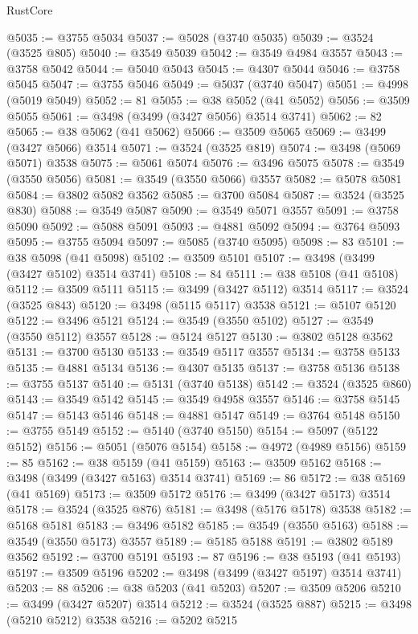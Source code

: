 \begin{lexlean}{RustCore}
\begin{coremodule}
@5035 := @3755 @5034
@5037 := @5028 (@3740 @5035)
@5039 := @3524 (@3525 @805)
@5040 := @3549 @5039
@5042 := @3549 @4984 @3557
@5043 := @3758 @5042
@5044 := @5040 @5043
@5045 := @4307 @5044
@5046 := @3758 @5045
@5047 := @3755 @5046
@5049 := @5037 (@3740 @5047)
@5051 := @4998 (@5019 @5049)
@5052 := 81
@5055 := @38 @5052 (@41 @5052)
@5056 := @3509 @5055
@5061 := @3498 (@3499 (@3427 @5056) @3514 @3741)
@5062 := 82
@5065 := @38 @5062 (@41 @5062)
@5066 := @3509 @5065
@5069 := @3499 (@3427 @5066) @3514
@5071 := @3524 (@3525 @819)
@5074 := @3498 (@5069 @5071) @3538
@5075 := @5061 @5074
@5076 := @3496 @5075
@5078 := @3549 (@3550 @5056)
@5081 := @3549 (@3550 @5066) @3557
@5082 := @5078 @5081
@5084 := @3802 @5082 @3562
@5085 := @3700 @5084
@5087 := @3524 (@3525 @830)
@5088 := @3549 @5087
@5090 := @3549 @5071 @3557
@5091 := @3758 @5090
@5092 := @5088 @5091
@5093 := @4881 @5092
@5094 := @3764 @5093
@5095 := @3755 @5094
@5097 := @5085 (@3740 @5095)
@5098 := 83
@5101 := @38 @5098 (@41 @5098)
@5102 := @3509 @5101
@5107 := @3498 (@3499 (@3427 @5102) @3514 @3741)
@5108 := 84
@5111 := @38 @5108 (@41 @5108)
@5112 := @3509 @5111
@5115 := @3499 (@3427 @5112) @3514
@5117 := @3524 (@3525 @843)
@5120 := @3498 (@5115 @5117) @3538
@5121 := @5107 @5120
@5122 := @3496 @5121
@5124 := @3549 (@3550 @5102)
@5127 := @3549 (@3550 @5112) @3557
@5128 := @5124 @5127
@5130 := @3802 @5128 @3562
@5131 := @3700 @5130
@5133 := @3549 @5117 @3557
@5134 := @3758 @5133
@5135 := @4881 @5134
@5136 := @4307 @5135
@5137 := @3758 @5136
@5138 := @3755 @5137
@5140 := @5131 (@3740 @5138)
@5142 := @3524 (@3525 @860)
@5143 := @3549 @5142
@5145 := @3549 @4958 @3557
@5146 := @3758 @5145
@5147 := @5143 @5146
@5148 := @4881 @5147
@5149 := @3764 @5148
@5150 := @3755 @5149
@5152 := @5140 (@3740 @5150)
@5154 := @5097 (@5122 @5152)
@5156 := @5051 (@5076 @5154)
@5158 := @4972 (@4989 @5156)
@5159 := 85
@5162 := @38 @5159 (@41 @5159)
@5163 := @3509 @5162
@5168 := @3498 (@3499 (@3427 @5163) @3514 @3741)
@5169 := 86
@5172 := @38 @5169 (@41 @5169)
@5173 := @3509 @5172
@5176 := @3499 (@3427 @5173) @3514
@5178 := @3524 (@3525 @876)
@5181 := @3498 (@5176 @5178) @3538
@5182 := @5168 @5181
@5183 := @3496 @5182
@5185 := @3549 (@3550 @5163)
@5188 := @3549 (@3550 @5173) @3557
@5189 := @5185 @5188
@5191 := @3802 @5189 @3562
@5192 := @3700 @5191
@5193 := 87
@5196 := @38 @5193 (@41 @5193)
@5197 := @3509 @5196
@5202 := @3498 (@3499 (@3427 @5197) @3514 @3741)
@5203 := 88
@5206 := @38 @5203 (@41 @5203)
@5207 := @3509 @5206
@5210 := @3499 (@3427 @5207) @3514
@5212 := @3524 (@3525 @887)
@5215 := @3498 (@5210 @5212) @3538
@5216 := @5202 @5215

\end{coremodule}
\end{lexlean}
